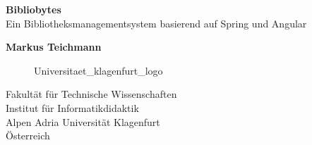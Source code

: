 \begin{titlepage}
    \begin{center}
        \vspace*{1cm}
        \Huge
        \textbf{Bibliobytes}\\
        \LARGE
        \vspace{0.5cm}
        Ein Bibliotheksmanagementsystem basierend auf Spring und Angular

        \vspace{1.5cm}


        \textbf{Markus Teichmann \vspace{-1.1cm} \\ \hspace{5.5cm} \footnotesize \footnotemark}

        \Large

        \vspace{3cm}

        \begin{figure}[htp]
            \centering
            {Universitaet_klagenfurt_logo}
        \end{figure}
        Fakultät für Technische Wissenschaften\\
        Institut für Informatikdidaktik\\
        Alpen Adria Universität Klagenfurt\\
        Österreich\\
        \datumVonHeute

    \end{center}
\end{titlepage}
